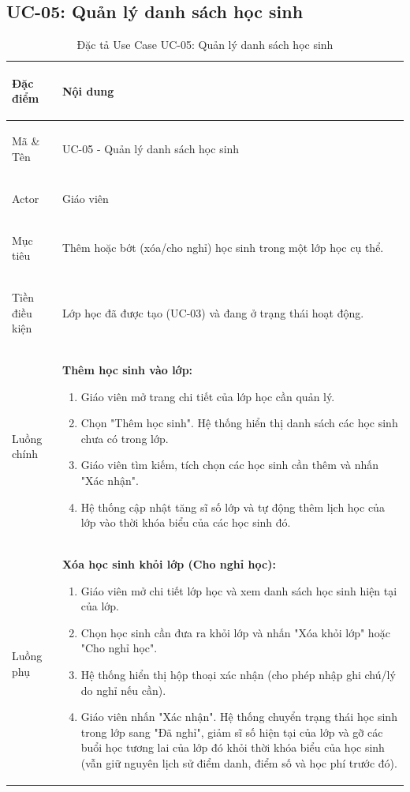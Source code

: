 \subsection{UC-05: Quản lý danh sách học sinh}

\begin{table}[h!]
\centering
\small
\caption{Đặc tả Use Case UC-05: Quản lý danh sách học sinh}
\label{tab:uc05-quan-ly-danh-sach-hoc-sinh}
\begin{tabularx}{\textwidth}{|>{\bfseries\raggedright\arraybackslash}p{2.5cm}|X|}
\hline
Đặc điểm & Nội dung \\ \hline
Mã \& Tên & UC-05 - Quản lý danh sách học sinh \\ \hline
Actor & Giáo viên \\ \hline
Mục tiêu & Thêm hoặc bớt (xóa/cho nghỉ) học sinh trong một lớp học cụ thể. \\ \hline
Tiền điều kiện & Lớp học đã được tạo (UC-03) và đang ở trạng thái hoạt động. \\ \hline
Luồng chính & 
\textbf{Thêm học sinh vào lớp:}
\begin{enumerate}
    \item Giáo viên mở trang chi tiết của lớp học cần quản lý.
    \item Chọn "Thêm học sinh". Hệ thống hiển thị danh sách các học sinh chưa có trong lớp.
    \item Giáo viên tìm kiếm, tích chọn các học sinh cần thêm và nhấn "Xác nhận".
    \item Hệ thống cập nhật tăng sĩ số lớp và tự động thêm lịch học của lớp vào thời khóa biểu của các học sinh đó.
\end{enumerate} \\ \hline
Luồng phụ & 
\textbf{Xóa học sinh khỏi lớp (Cho nghỉ học):}
\begin{enumerate}
    \item Giáo viên mở chi tiết lớp học và xem danh sách học sinh hiện tại của lớp.
    \item Chọn học sinh cần đưa ra khỏi lớp và nhấn "Xóa khỏi lớp" hoặc "Cho nghỉ học".
    \item Hệ thống hiển thị hộp thoại xác nhận (cho phép nhập ghi chú/lý do nghỉ nếu cần).
    \item Giáo viên nhấn "Xác nhận". Hệ thống chuyển trạng thái học sinh trong lớp sang "Đã nghỉ", giảm sĩ số hiện tại của lớp và gỡ các buổi học tương lai của lớp đó khỏi thời khóa biểu của học sinh (vẫn giữ nguyên lịch sử điểm danh, điểm số và học phí trước đó).
\end{enumerate} \\ \hline

\end{tabularx}
\end{table}
